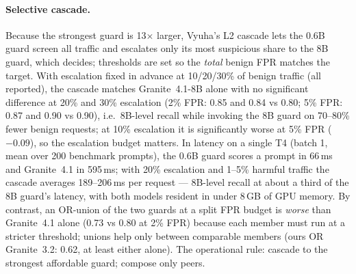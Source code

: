 \documentclass[11pt]{article}
\begin{document}
\paragraph{Selective cascade.} Because the strongest guard is 13$\times$ larger, Vyuha's L2 cascade lets
the 0.6B guard screen all traffic and escalates only its most suspicious share to the 8B guard, which
decides; thresholds are set so the \emph{total} benign FPR matches the target. With escalation fixed in
advance at 10/20/30\% of benign traffic (all reported), the cascade matches Granite~4.1-8B alone with no
significant difference at 20\% and 30\% escalation (2\% FPR: 0.85 and 0.84 vs 0.80; 5\% FPR: 0.87 and 0.90
vs 0.90), i.e.\ 8B-level recall while invoking the 8B guard on 70--80\% fewer benign requests; at 10\%
escalation it is significantly worse at 5\% FPR ($-0.09$), so the escalation budget matters. In latency
on a single T4 (batch 1, mean over 200 benchmark prompts), the 0.6B guard scores a prompt in 66\,ms and
Granite~4.1 in 595\,ms; with 20\% escalation and 1--5\% harmful traffic the cascade averages 189--206\,ms
per request --- 8B-level recall at about a third of the 8B guard's latency, with both models resident in
under 8\,GB of GPU memory. By contrast,
an OR-union of the two guards at a split FPR budget is \emph{worse} than Granite~4.1 alone (0.73 vs 0.80 at
2\% FPR) because each member must run at a stricter threshold; unions help only between comparable
members (ours OR Granite~3.2: 0.62, at least either alone). The operational rule: cascade to the
strongest affordable guard; compose only peers.
\end{document}

